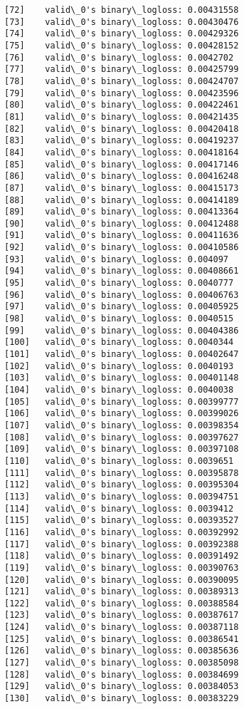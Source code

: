 \documentclass[11pt]{article}
\begin{document}
\begin{Verbatim}[commandchars=\\\{\}]
[72]	valid\_0's binary\_logloss: 0.00431558
[73]	valid\_0's binary\_logloss: 0.00430476
[74]	valid\_0's binary\_logloss: 0.00429326
[75]	valid\_0's binary\_logloss: 0.00428152
[76]	valid\_0's binary\_logloss: 0.0042702
[77]	valid\_0's binary\_logloss: 0.00425799
[78]	valid\_0's binary\_logloss: 0.00424707
[79]	valid\_0's binary\_logloss: 0.00423596
[80]	valid\_0's binary\_logloss: 0.00422461
[81]	valid\_0's binary\_logloss: 0.00421435
[82]	valid\_0's binary\_logloss: 0.00420418
[83]	valid\_0's binary\_logloss: 0.00419237
[84]	valid\_0's binary\_logloss: 0.00418164
[85]	valid\_0's binary\_logloss: 0.00417146
[86]	valid\_0's binary\_logloss: 0.00416248
[87]	valid\_0's binary\_logloss: 0.00415173
[88]	valid\_0's binary\_logloss: 0.00414189
[89]	valid\_0's binary\_logloss: 0.00413364
[90]	valid\_0's binary\_logloss: 0.00412488
[91]	valid\_0's binary\_logloss: 0.00411636
[92]	valid\_0's binary\_logloss: 0.00410586
[93]	valid\_0's binary\_logloss: 0.004097
[94]	valid\_0's binary\_logloss: 0.00408661
[95]	valid\_0's binary\_logloss: 0.0040777
[96]	valid\_0's binary\_logloss: 0.00406763
[97]	valid\_0's binary\_logloss: 0.00405925
[98]	valid\_0's binary\_logloss: 0.0040515
[99]	valid\_0's binary\_logloss: 0.00404386
[100]	valid\_0's binary\_logloss: 0.0040344
[101]	valid\_0's binary\_logloss: 0.00402647
[102]	valid\_0's binary\_logloss: 0.0040193
[103]	valid\_0's binary\_logloss: 0.00401148
[104]	valid\_0's binary\_logloss: 0.0040038
[105]	valid\_0's binary\_logloss: 0.00399777
[106]	valid\_0's binary\_logloss: 0.00399026
[107]	valid\_0's binary\_logloss: 0.00398354
[108]	valid\_0's binary\_logloss: 0.00397627
[109]	valid\_0's binary\_logloss: 0.00397108
[110]	valid\_0's binary\_logloss: 0.0039651
[111]	valid\_0's binary\_logloss: 0.00395878
[112]	valid\_0's binary\_logloss: 0.00395304
[113]	valid\_0's binary\_logloss: 0.00394751
[114]	valid\_0's binary\_logloss: 0.0039412
[115]	valid\_0's binary\_logloss: 0.00393527
[116]	valid\_0's binary\_logloss: 0.00392992
[117]	valid\_0's binary\_logloss: 0.00392388
[118]	valid\_0's binary\_logloss: 0.00391492
[119]	valid\_0's binary\_logloss: 0.00390763
[120]	valid\_0's binary\_logloss: 0.00390095
[121]	valid\_0's binary\_logloss: 0.00389313
[122]	valid\_0's binary\_logloss: 0.00388584
[123]	valid\_0's binary\_logloss: 0.00387617
[124]	valid\_0's binary\_logloss: 0.00387118
[125]	valid\_0's binary\_logloss: 0.00386541
[126]	valid\_0's binary\_logloss: 0.00385636
[127]	valid\_0's binary\_logloss: 0.00385098
[128]	valid\_0's binary\_logloss: 0.00384699
[129]	valid\_0's binary\_logloss: 0.00384053
[130]	valid\_0's binary\_logloss: 0.00383229

\end{Verbatim}
\end{document}
